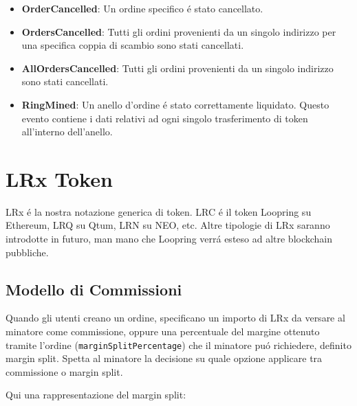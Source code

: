 \documentclass[UTF8,nofonts]{article}
\makeatletter
\newenvironment{figurehere}
 {\def\@captype{figure}}
 {}
\makeatother
\begin{document}
\begin{multicols}{2}
\begin{itemize}
	\item \textbf{OrderCancelled}: Un ordine specifico \'e stato cancellato.
	\item \textbf{OrdersCancelled}: Tutti gli ordini provenienti da un singolo indirizzo per una specifica coppia di scambio sono stati cancellati.
	\item \textbf{AllOrdersCancelled}: Tutti gli ordini provenienti da un singolo indirizzo sono stati cancellati.
	\item \textbf{RingMined}: Un anello d'ordine \'e stato correttamente liquidato. Questo evento contiene i dati relativi ad ogni singolo trasferimento di token all'interno dell'anello.
\end{itemize}


\section{LRx Token\label{sec:token}}
LRx \'e la nostra notazione generica di token. LRC \'e il token Loopring su Ethereum, LRQ su Qtum, LRN su NEO, etc. Altre tipologie di LRx saranno introdotte in futuro, man mano che Loopring verr\'a esteso ad altre blockchain pubbliche.

\subsection{Modello di Commissioni\label{sec:fee_model}}
Quando gli utenti creano un ordine, specificano un importo di LRx da versare al minatore come commissione, oppure una percentuale del margine ottenuto tramite l'ordine (\verb|marginSplitPercentage|)  che il minatore pu\'o richiedere, definito margin split. Spetta al minatore la decisione su quale opzione applicare tra commissione o margin split.

Qui una rappresentazione del margin split:

\begin{center}
\begin{figurehere}
\centering
{}
\end{figurehere}
\end{center}
\end{multicols}
\end{document}
